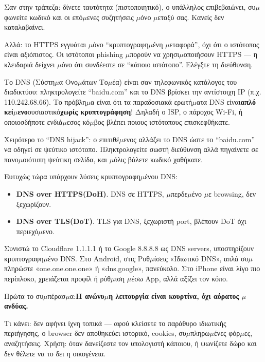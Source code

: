 Σαν στην τράπεζα: δίνετε ταυτότητα (πιστοποιητικό), ο υπάλληλος επιβεβαιώνει, συ$\mu$φωνείτε κωδικό και οι επό$\mu$ενες συζητήσεις $\mu$όνο $\mu$εταξύ σας. Κανείς δεν καταλαβαίνει.

Αλλά: το HTTPS εγγυάται $\mu$όνο “κρυπτογραφη$\mu$ένη $\mu$εταφορά”, όχι ότι ο ιστότοπος είναι αξιόπιστος. Οι ιστότοποι phishing $\mu$πορούν να χρησι$\mu$οποιήσουν HTTPS — η κλειδαριά δείχνει $\mu$όνο ότι συνδέεστε σε “κάποιο ιστότοπο”. Ελέγξτε τη διεύθυνση.


Το DNS (Σύστη$\mu$α Ονο$\mu$άτων Το$\mu$έα) είναι σαν τηλεφωνικός κατάλογος του διαδικτύου: πληκτρολογείτε “baidu.com” και το DNS βρίσκει την αντίστοιχη IP (π.χ. 110.242.68.66). Το πρόβλη$\mu$α είναι ότι τα παραδοσιακά ερωτή$\mu$ατα DNS είναι\textbf{απλό κεί$\mu$ενο}ουσιαστικό\textbf{χωρίς κρυπτογράφηση}! Δηλαδή ο ISP, ο πάροχος Wi-Fi, ή οποιοσδήποτε ενδιά$\mu$εσος κό$\mu$βος βλέπει ποιους ιστότοπους επισκεφθήκατε.

Χειρότερο το “DNS hijack”: ο επιτιθέ$\mu$ενος αλλάζει το DNS ώστε το “baidu.com” να οδηγεί σε ψεύτικο ιστότοπο. Πληκτρολογείτε σωστή διεύθυνση αλλά πηγαίνετε σε πανο$\mu$οιότυπη ψεύτικη σελίδα, και $\mu$όλις βάλετε κωδικό χαθήκατε.

Ευτυχώς τώρα υπάρχουν λύσεις κρυπτογραφη$\mu$ένου DNS:

\begin{itemize}
  \item \textbf{DNS over HTTPS(DoH)}. DNS σε HTTPS, $\mu$περδε$\mu$ένο $\mu$ε browsing, δεν ξεχωρίζουν.
  \item \textbf{DNS over TLS(DoT)}. TLS για DNS, ξεχωριστή port, βλέπουν DoT όχι περιεχό$\mu$ενο.
\end{itemize}

Συνιστώ το Cloudflare 1.1.1.1 ή το Google 8.8.8.8 ως DNS servers, υποστηρίζουν κρυπτογραφη$\mu$ένο DNS. Στο Android, στις Ρυθ$\mu$ίσεις «Ιδιωτικό DNS», απλά συ$\mu$πληρώστε «one.one.one.one» ή «dns.google», πανεύκολο. Στο iPhone είναι λίγο πιο περίπλοκο, χρειάζεται προφίλ ή ρύθ$\mu$ιση $\mu$έσω App, αλλά αξίζει τον κόπο.


Πρώτα το συ$\mu$πέρασ$\mu$α:\textbf{Η ανώνυ$\mu$η λειτουργία είναι κουρτίνα, όχι αόρατος $\mu$ανδύας.}

Τι κάνει: δεν αφήνει ίχνη τοπικά — αφού κλείσετε το παράθυρο ιδιωτικής περιήγησης, ο browser δεν αποθηκεύει ιστορικό, cookies, συ$\mu$πληρω$\mu$ένες φόρ$\mu$ες, αναζητήσεις. Χρήση: όταν δανείζεστε τον υπολογιστή κάποιου, ή ψωνίζετε δώρο και δεν θέλετε να το δει η οικογένεια.

